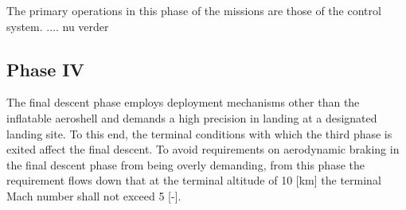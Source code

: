 The primary operations in this phase of the missions are those of the control system. .... nu verder

\subsection{Phase IV}\label{sec:p4}
The final descent phase employs deployment mechanisms other than the inflatable aeroshell and demands a high precision in landing at a designated landing site. To this end, the terminal conditions with which the third phase is exited affect the final descent. To avoid requirements on aerodynamic braking in the final descent phase from being overly demanding, from this phase the requirement flows down that at the terminal altitude of 10 [km] the terminal Mach number shall not exceed 5 [-]. 

